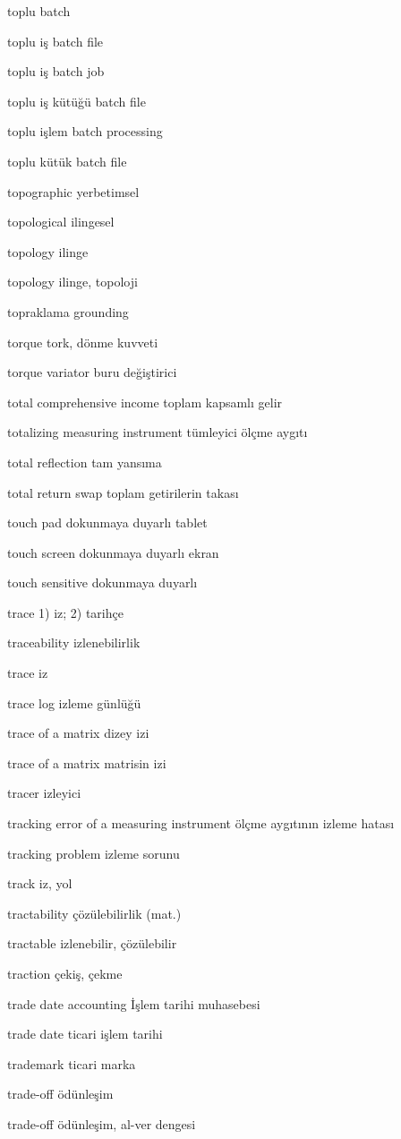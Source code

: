 \documentclass[12pt,fleqn]{article}\usepackage{../../common}
\begin{document}
toplu batch

toplu iş batch file

toplu iş batch job

toplu iş kütüğü batch file

toplu işlem batch processing

toplu kütük batch file

topographic yerbetimsel

topological ilingesel

topology ilinge

topology ilinge, topoloji

topraklama grounding

torque tork, dönme kuvveti

torque variator buru değiştirici

total comprehensive income toplam kapsamlı gelir

totalizing measuring instrument tümleyici ölçme aygıtı

total reflection tam yansıma

total return swap toplam getirilerin takası

touch pad dokunmaya duyarlı tablet

touch screen dokunmaya duyarlı ekran

touch sensitive dokunmaya duyarlı

trace 1) iz; 2) tarihçe

traceability izlenebilirlik

trace iz

trace log izleme günlüğü

trace of a matrix dizey izi

trace of a matrix matrisin izi

tracer izleyici

tracking error of a measuring instrument ölçme aygıtının izleme hatası

tracking problem izleme sorunu

track iz, yol

tractability çözülebilirlik (mat.)

tractable izlenebilir, çözülebilir

traction çekiş, çekme

trade date accounting İşlem tarihi muhasebesi

trade date ticari işlem tarihi

trademark ticari marka

trade-off ödünleşim

trade-off ödünleşim, al-ver dengesi
\end{document}
